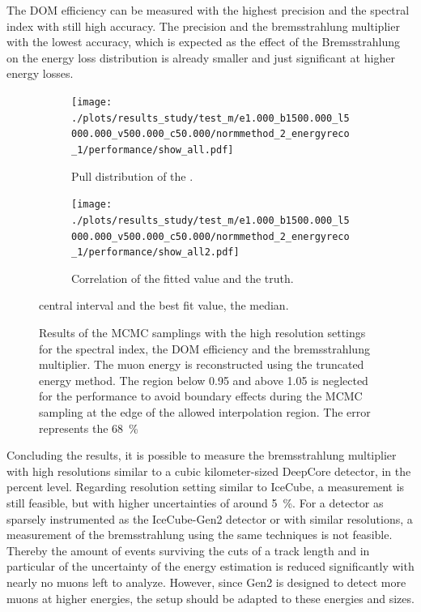 The DOM efficiency can be measured with the highest precision and the spectral index with still high accuracy.
The precision and the bremsstrahlung multiplier with the lowest accuracy, which is expected as the effect of the Bremsstrahlung on the energy loss distribution is already smaller and just significant at higher energy losses.
\begin{figure}
    \centering
    \begin{subfigure}{0.65\textwidth}
        \centering
        \texttt{[image: ./plots/results\_study/test\_m/e1.000\_b1500.000\_l5000.000\_v500.000\_c50.000/normmethod\_2\_energyreco\_1/performance/show\_all.pdf]}
        \caption{Pull distribution of the .}
        \label{fig:study_result_pull}
        \vspace{0.5cm}
    \end{subfigure}
    \begin{subfigure}{0.65\textwidth}
        \centering
        \texttt{[image: ./plots/results\_study/test\_m/e1.000\_b1500.000\_l5000.000\_v500.000\_c50.000/normmethod\_2\_energyreco\_1/performance/show\_all2.pdf]}
        \caption{Correlation of the fitted value and the truth.}
        \label{fig:study_result_corr}
    \end{subfigure}
    \caption{Results of the MCMC samplings with the high resolution settings for the spectral index, the DOM efficiency and the bremsstrahlung multiplier. The muon energy is reconstructed using the truncated energy method. The region below 0.95 and above 1.05 is neglected for the performance to avoid boundary effects during the MCMC sampling at the edge of the allowed interpolation region. The error represents the \SI{68}{\%}} central interval and the best fit value, the median.
    \label{fig:study_result_show}
\end{figure}

Concluding the results, it is possible to measure the bremsstrahlung multiplier with high resolutions similar to a cubic kilometer-sized DeepCore detector, in the percent level.
Regarding resolution setting similar to IceCube, a measurement is still feasible, but with higher uncertainties of around \SI{5}{\%}.
For a detector as sparsely instrumented as the IceCube-Gen2 detector or with similar resolutions, a measurement of the bremsstrahlung using the same techniques is not feasible.
Thereby the amount of events surviving the cuts of a track length and in particular of the uncertainty of the energy estimation is reduced significantly with nearly no muons left to analyze.
However, since Gen2 is designed to detect more muons at higher energies, the setup should be adapted to these energies and sizes.

